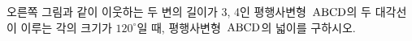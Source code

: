 \noindent\begin{minipage}[t]{0.58\linewidth}\vspace{0pt}\raggedright 오른쪽 그림과 같이 이웃하는 두 변의 길이가 3, 4인 평행사변형~$\mathrm{ABCD}$의 두 대각선이 이루는 각의 크기가 $120^\circ$일 때, 평행사변형~$\mathrm{ABCD}$의 넓이를 구하시오.\end{minipage}\hfill\begin{minipage}[t]{0.4\linewidth}\vspace{0pt}\centering \resizebox{\ifdim\width>\linewidth\linewidth\else\width\fi}{!}{}\end{minipage}\par
